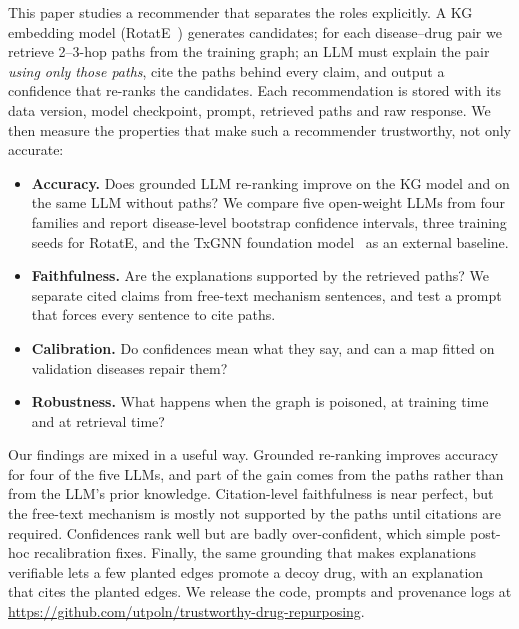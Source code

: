 \documentclass[electronics,article,submit]{Definitions/mdpi}
\begin{document}
This paper studies a recommender that separates the roles explicitly. A KG embedding model (RotatE~\cite{sun2019rotate}) generates candidates; for each disease--drug pair we retrieve 2--3-hop paths from the training graph; an LLM must explain the pair \emph{using only those paths}, cite the paths behind every claim, and output a confidence that re-ranks the candidates. Each recommendation is stored with its data version, model checkpoint, prompt, retrieved paths and raw response. We then measure the properties that make such a recommender trustworthy, not only accurate:
\begin{itemize}
\item \textbf{Accuracy.} Does grounded LLM re-ranking improve on the KG model and on the same LLM without paths? We compare five open-weight LLMs from four families and report disease-level bootstrap confidence intervals, three training seeds for RotatE, and the TxGNN foundation model~\cite{huang2024txgnn} as an external baseline.
\item \textbf{Faithfulness.} Are the explanations supported by the retrieved paths? We separate cited claims from free-text mechanism sentences, and test a prompt that forces every sentence to cite paths.
\item \textbf{Calibration.} Do confidences mean what they say, and can a map fitted on validation diseases repair them?
\item \textbf{Robustness.} What happens when the graph is poisoned, at training time and at retrieval time?
\end{itemize}

Our findings are mixed in a useful way. Grounded re-ranking improves accuracy for four of the five LLMs, and part of the gain comes from the paths rather than from the LLM's prior knowledge. Citation-level faithfulness is near perfect, but the free-text mechanism is mostly not supported by the paths until citations are required. Confidences rank well but are badly over-confident, which simple post-hoc recalibration fixes. Finally, the same grounding that makes explanations verifiable lets a few planted edges promote a decoy drug, with an explanation that cites the planted edges. We release the code, prompts and provenance logs at \url{https://github.com/utpoln/trustworthy-drug-repurposing}.

\end{document}
